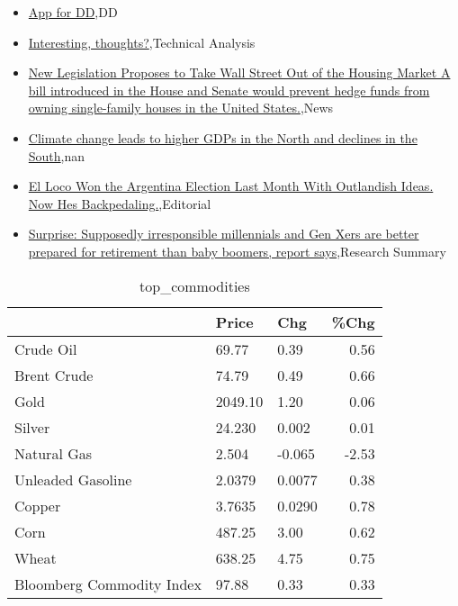 \documentclass{article}%
\begin{document}
%
\begin{itemize}%
\item%
\href{https://reddit.com/r/Baystreetbets/comments/18cj74c/app\_for\_dd/}{App for DD},DD%
\item%
\href{https://reddit.com/r/StockMarket/comments/18cokax/interesting\_thoughts/}{Interesting, thoughts?},Technical Analysis%
\item%
\href{https://reddit.com/r/Economics/comments/18cpjo3/new\_legislation\_proposes\_to\_take\_wall\_street\_out/}{New Legislation Proposes to Take Wall Street Out of the Housing Market A bill introduced in the House and Senate would prevent hedge funds from owning single-family houses in the United States.},News%
\item%
\href{https://reddit.com/r/Economics/comments/18cgnvd/climate\_change\_leads\_to\_higher\_gdps\_in\_the\_north/}{Climate change leads to higher GDPs in the North and declines in the South},nan%
\item%
\href{https://reddit.com/r/Economics/comments/18cckzz/el\_loco\_won\_the\_argentina\_election\_last\_month/}{El Loco Won the Argentina Election Last Month With Outlandish Ideas. Now Hes Backpedaling.},Editorial%
\item%
\href{https://reddit.com/r/Economics/comments/18c8odz/surprise\_supposedly\_irresponsible\_millennials\_and/}{Surprise: Supposedly irresponsible millennials and Gen Xers are better prepared for retirement than baby boomers, report says},Research Summary%
\end{itemize}%


\begin{table}[htbp]%
\caption{top\_commodities}%
\centering%
\begin{adjustbox}{width=1\textwidth}%
\begin{tabular}{lllr}
\toprule
                          &   Price &    Chg &  \%Chg \\
\midrule
               Crude Oil  &   69.77 &   0.39 &  0.56 \\
             Brent Crude  &   74.79 &   0.49 &  0.66 \\
                    Gold  & 2049.10 &   1.20 &  0.06 \\
                  Silver  &  24.230 &  0.002 &  0.01 \\
             Natural Gas  &   2.504 & -0.065 & -2.53 \\
       Unleaded Gasoline  &  2.0379 & 0.0077 &  0.38 \\
                  Copper  &  3.7635 & 0.0290 &  0.78 \\
                    Corn  &  487.25 &   3.00 &  0.62 \\
                   Wheat  &  638.25 &   4.75 &  0.75 \\
Bloomberg Commodity Index &   97.88 &   0.33 &  0.33 \\
\bottomrule
\end{tabular}
%
\end{adjustbox}%
\end{table}
\end{document}
